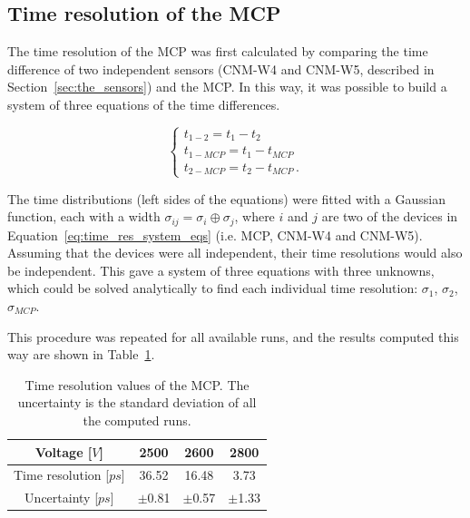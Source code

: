 \subsection{Time resolution of the MCP}
The time resolution of the MCP was first calculated by comparing the time difference of two independent sensors (CNM-W4 and CNM-W5, described in Section~\ref{sec:the_sensors}) and the MCP. In this way, it was possible to build a system of three equations of the time differences.

\begin{equation}\label{eq:time_res_system_eqs}
    \begin{cases}
        t_{1-2} = t_1 - t_2  \\
        t_{1-MCP} = t_1 - t_{MCP} \\
        t_{2-MCP} = t_2 - t_{MCP} \, .
    \end{cases}
\end{equation}

The time distributions (left sides of the equations) were fitted with a Gaussian function, each with a width \(\sigma_{ij} = \sigma_i \oplus \sigma_j\), where \(i\) and \(j\) are two of the devices in Equation~\ref{eq:time_res_system_eqs} (i.e. MCP, CNM-W4 and CNM-W5). Assuming that the devices were all independent, their time resolutions would also be independent. This gave a system of three equations with three unknowns, which could be solved analytically to find each individual time resolution: \(\sigma_1\), \(\sigma_2\), \(\sigma_{MCP}\).

This procedure was repeated for all available runs, and the results computed this way are shown in Table~\ref{tab:MCP_time_resolution}.
\begin{table}[h!tbp]
    \begin{center}
        \captionsetup{width=\captionwidth}
        \caption{Time resolution values of the MCP. The uncertainty is the standard deviation of all the computed runs.}
        \label{tab:MCP_time_resolution}
        \begin{tabular}{ | c | c | c | c | }
            \hline
            Voltage [\(\si{V}\)] & 2500 & 2600 & 2800 \\ 
            \hline 
            Time resolution [\(\si{ps}\)] & 36.52 & 16.48 & 3.73 \\  
            Uncertainty [\(\si{ps}\)] & \(\pm\)0.81 & \(\pm\)0.57 & \(\pm\)1.33 \\
            \hline
        \end{tabular}
    \end{center}
\end{table}


